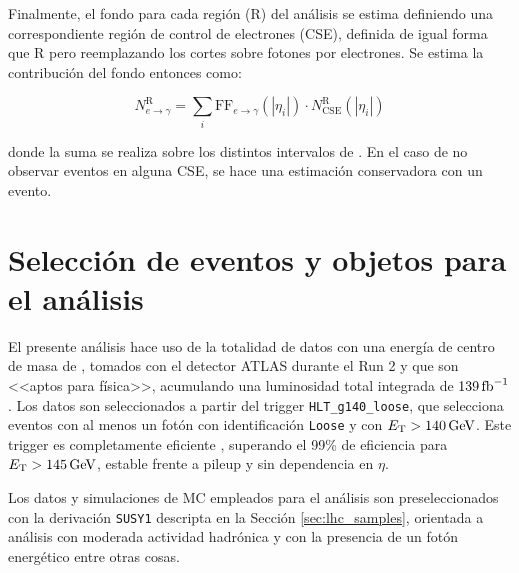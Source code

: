 Finalmente, el fondo para cada región (R) del análisis se estima definiendo una correspondiente región de control de electrones (CSE), definida de igual forma que R pero reemplazando los cortes sobre fotones por electrones. Se estima la contribución del fondo entonces como:



\begin{equation}
  N^{\text{R}}_{e\rightarrow\gamma} = \sum_{i} \text{FF}_{e\to\gamma}(|\eta_i|) \cdot N^{\text{R}}_{\mathrm{CSE}} (|\eta_i|)
  \label{eq:efake_cs}
\end{equation}

\noindent
donde la suma se realiza sobre los distintos intervalos de \absEta.
En el caso de no observar eventos en alguna CSE, se hace una estimación conservadora con un evento.



\section{Selección de eventos y objetos para el análisis}\label{sec:selection}

El presente análisis hace uso de la totalidad de datos con una energía de centro de masa de , tomados con el detector ATLAS durante el Run 2 y que son <<aptos para física>>, acumulando una luminosidad total integrada de $139\,\text{fb}^{-1}$. Los datos son seleccionados a partir del trigger \texttt{HLT\_g140\_loose}, que selecciona eventos con al menos un fotón con identificación \texttt{Loose} y con $E_{\text{T}}>140\,\text{GeV}$. Este trigger es completamente eficiente \cite{TRIG-2018-05}, superando el 99\% de eficiencia para $E_{\text{T}}>145\,\text{GeV}$, estable frente a pileup y sin dependencia en $\eta$.

Los datos y simulaciones de MC empleados para el análisis son preseleccionados con la derivación \texttt{SUSY1} descripta en la Sección \ref{sec:lhc_samples}, orientada a análisis con moderada actividad hadrónica y con la presencia de un fotón energético entre otras cosas.


